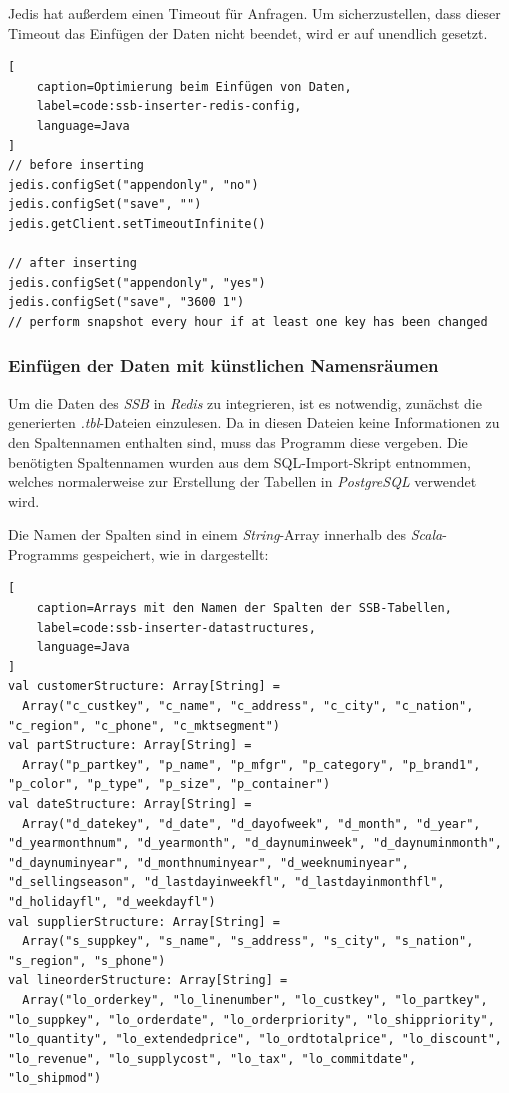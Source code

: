 Jedis hat außerdem einen Timeout für Anfragen. Um sicherzustellen, dass dieser Timeout das Einfügen der Daten nicht beendet, wird er auf unendlich gesetzt.

\begin{lstlisting}[
    caption=Optimierung beim Einfügen von Daten,
    label=code:ssb-inserter-redis-config,
    language=Java
]
// before inserting
jedis.configSet("appendonly", "no")
jedis.configSet("save", "")
jedis.getClient.setTimeoutInfinite()

// after inserting
jedis.configSet("appendonly", "yes")
jedis.configSet("save", "3600 1")
// perform snapshot every hour if at least one key has been changed
\end{lstlisting}


\subsubsection{Einfügen der Daten mit künstlichen Namensräumen}
Um die Daten des \emph{SSB} in \emph{Redis} zu integrieren, ist es notwendig, zunächst die generierten \emph{.tbl}-Dateien einzulesen. Da in diesen Dateien keine Informationen zu den Spaltennamen enthalten sind, muss das Programm diese vergeben. Die benötigten Spaltennamen wurden aus dem SQL-Import-Skript entnommen, welches normalerweise zur Erstellung der Tabellen in \emph{PostgreSQL} verwendet wird.

Die Namen der Spalten sind in einem \emph{String}-Array innerhalb des \emph{Scala}-Programms gespeichert, wie in  dargestellt:

\begin{lstlisting}[
    caption=Arrays mit den Namen der Spalten der SSB-Tabellen,
    label=code:ssb-inserter-datastructures,
    language=Java
]
val customerStructure: Array[String] =
  Array("c_custkey", "c_name", "c_address", "c_city", "c_nation", "c_region", "c_phone", "c_mktsegment")
val partStructure: Array[String] =
  Array("p_partkey", "p_name", "p_mfgr", "p_category", "p_brand1", "p_color", "p_type", "p_size", "p_container")
val dateStructure: Array[String] =
  Array("d_datekey", "d_date", "d_dayofweek", "d_month", "d_year", "d_yearmonthnum", "d_yearmonth", "d_daynuminweek", "d_daynuminmonth", "d_daynuminyear", "d_monthnuminyear", "d_weeknuminyear", "d_sellingseason", "d_lastdayinweekfl", "d_lastdayinmonthfl", "d_holidayfl", "d_weekdayfl")
val supplierStructure: Array[String] =
  Array("s_suppkey", "s_name", "s_address", "s_city", "s_nation", "s_region", "s_phone")
val lineorderStructure: Array[String] =
  Array("lo_orderkey", "lo_linenumber", "lo_custkey", "lo_partkey", "lo_suppkey", "lo_orderdate", "lo_orderpriority", "lo_shippriority", "lo_quantity", "lo_extendedprice", "lo_ordtotalprice", "lo_discount", "lo_revenue", "lo_supplycost", "lo_tax", "lo_commitdate", "lo_shipmod")

\end{lstlisting}


